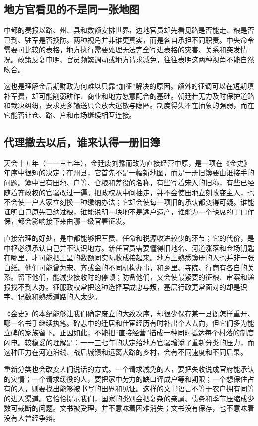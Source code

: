 \subsection{地方官看见的不是同一张地图}

中都的奏报以路、州、县和数额安排世界，边地官员却先看见路是否能走、粮是否已到、驻军是否换防。两种视角并非谁更真实，而是各自承担不同职责。中央命令需要可比较的表格，地方执行需要处理无法完全写进表格的灾害、关系和突发情况。政策反复申明、官员频繁调动或地方请求减免，往往表明这两种视角不能自然吻合。

这也是理解金后期财政为何难以只靠“加征”解决的原因。额外的征调可以在短期填补军费，却可能削弱耕作、商业和地方愿意配合的基础。朝廷若无力及时保护道路和裁决纠纷，要求更多输送只会放大逃散与隐匿。制度得失不在抽象的强弱，而在它能否让仓、路、户和市场继续相互连接。

\subsection{代理撤去以后，谁来认得一册旧簿}

天会十五年（一一三七年），金廷废刘豫而改为直接经营中原，是一项在《金史》年序中很短的决定；在州县，它首先不是一幅新地图，而是一册旧簿要由谁接手的问题。簿中已有田地、户等、仓粮和差役的名称，有些写着宋人的旧称，有些已经随着齐政权的官署改过一遍。把政权从中间抽走，并不会使田地立刻改变主人，也不会使一户人家立刻换一种缴纳办法；它却会使每一项旧的承认都变得可疑。谁能证明自己原先已纳过粮，谁能说明一块地不是逃户遗产，谁能为一个缺席的丁口作保，都会影响接下来由哪一级官署征发。

直接治理的好处，是中都能够把军费、任命和税源收进较少的环节；它的代价，是中枢必须承认自己并不认识地方。新任官员需要懂得旧地名、河道涨落和仓场钥匙在哪里，才可能把上呈的数额同实际收成接起来。地方上熟悉簿册的人也并非一张白纸。他们可能曾为宋、齐或金的不同机构办事，和乡里、寺院、行商有各自的关系。留下他们，能减少接收时的停顿；防备他们，又会使最紧要的征粮、审案和递报找不到人办。征服政权常把这种选择写成忠与叛，基层行政更常面对的却是识字、记数和熟悉道路的人太少。

《金史》的本纪能够让我们确定废立的大致次序，却很少保存某一县衙怎样重开、哪一名书手继续执笔。碑志中的迁居和仕宦经历有时补出个人去向，但它们多为能立碑的家族留下。正因如此，不能把“直接经营”描成一种同时抵达每个村落的制度闪电。较稳妥的理解是：一一三七年的决定给地方官署增添了重新分类的压力，而这种压力在河道沿线、战后城镇和远离大路的乡村，会有不同速度和不同后果。

重新分类也会改变人们说话的方式。一个请求减免的人，要把失收说成官府能承认的灾情；一个请求缓役的人，要把家中劳力的缺口译成户等和期限；一个想保住占有的人，则要找出能够被书写的田界和见证。这样的文书语言不等于农户拥有同等的进入渠道。它恰恰提示我们，国家的类别会把复杂的亲属、债务和季节压缩成少数可裁断的问题。文书被受理，并不意味着困难消失；文书没有保存，也不意味着没有人曾经争辩。

